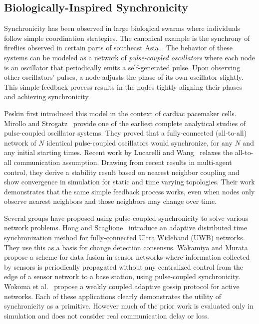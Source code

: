 \documentclass{sig-alternate}
\begin{document}
\subsection{Biologically-Inspired Synchronicity}

Synchronicity has been observed in large biological swarms where
individuals follow simple coordination strategies. The canonical
example is the synchrony of fireflies observed in certain parts of
southeast Asia~\cite{strogatz}.  The behavior of these systems can be
modeled as a network of {\em pulse-coupled oscillators} where each
node is an oscillator that periodically emits a self-generated pulse.
Upon observing other oscillators' pulses, a node adjusts the phase of
its own oscillator slightly. This simple feedback process results in
the nodes tightly aligning their phases and achieving synchronicity.

Peskin first introduced this model in the context of cardiac pacemaker
cells\cite{peskin75}. Mirollo and Strogatz~\cite{strogatz} provide one
of the earliest complete analytical studies of pulse-coupled
oscillator systems. They proved that a fully-connected (all-to-all)
network of $N$ identical pulse-coupled oscillators would synchronize,
for any $N$ and any initial starting times. Recent work by Lucarelli
and Wang~\cite{lucarelli04} relaxes the all-to-all communication
assumption. Drawing from recent results in multi-agent control, they
derive a stability result based on nearest neighbor coupling and show
convergence in simulation for static and time varying
topologies. Their work demonstrates that the same simple feedback
process works, even when nodes only observe nearest neighbors and
those neighbors may change over time.

Several groups have proposed using pulse-coupled synchronicity to
solve various network problems. Hong and
Scaglione~\cite{tsrbc03,hcs04} introduce an adaptive distributed time
synchronization method for fully-connected Ultra Wideband (UWB)
networks. They use this as a basis for change detection
consensus. Wakamiya and Murata~\cite{wm04} propose a scheme for data
fusion in sensor networks where information collected by sensors is
periodically propagated without any centralized control from the edge
of a sensor network to a base station, using pulse-coupled
synchronicity. Wokoma et al.~\cite{wl02} propose a weakly coupled
adaptive gossip protocol for active networks. Each
of these applications clearly demonstrates the utility of
synchronicity as a primitive. However much of the prior work is
evaluated only in simulation and does not consider real communication
delay or loss.
\end{document}
